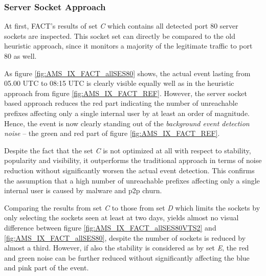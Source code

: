 \subsubsection{Server Socket Approach}

At first, \gls{FACT}'s results of set \emph{C} which contains all detected port 80 \glspl{server socket} are inspected. 
This socket set can directly be compared to the old heuristic approach, since it monitors a majority of the legitimate traffic to port 80 as well. 

As figure \ref{fig:AMS_IX_FACT_allSES80} shows, the actual event lasting from 05.00 UTC to 08:15 UTC is clearly visible equally well as in the heuristic approach from figure \ref{fig:AMS_IX_FACT_REF}. 
However, the \gls{server socket} based approach reduces the red part indicating the number of unreachable prefixes affecting only a single internal user by at least an order of magnitude. 
Hence, the event is now clearly standing out of the \emph{background event detection noise} -- the green and red part of figure \ref{fig:AMS_IX_FACT_REF}. 

Despite the fact that the set \emph{C} is not optimized at all with respect to stability, popularity and visibility, it outperforms the traditional approach in terms of noise reduction without significantly worsen the actual event detection. 
This confirms the assumption that a high number of unreachable prefixes affecting only a single internal user is caused by malware and \gls{p2p} churn.

Comparing the results from set \emph{C} to those from set \emph{D} which limits the sockets by only selecting the sockets seen at least at two days, yields almost no visual difference between figure \ref{fig:AMS_IX_FACT_allSES80VTS2} and \ref{fig:AMS_IX_FACT_allSES80}, despite the number of sockets is reduced by almost a third. 
However, if also the stability is considered as by set \emph{E}, the red and green noise can be further reduced without significantly affecting the blue and pink part of the event.

